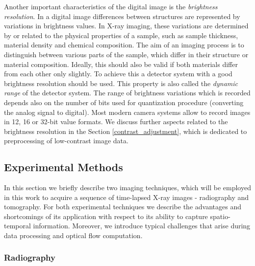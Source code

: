 


Another important characteristics of the digital image is the \textit{brightness resolution}. In a digital image differences between structures are represented by variations in brightness values. In X-ray imaging, these variations are determined by or related to the physical properties of a sample, such as sample thickness, material density and chemical composition. The aim of an imaging process is to distinguish between various parts of the sample, which differ in their structure or material composition. Ideally, this should also be valid if both materials differ from each other only slightly. To achieve this a detector system with a good brightness resolution should be used. This property is also called the \textit{dynamic range} of the detector system. The range of brightness variations which is recorded depends also on the number of bits used for quantization procedure (converting the analog signal to digital).  Most modern camera systems allow to record images in 12, 16 or 32-bit value formats. We discuss further aspects related to the brightness resolution in the Section \ref{contrast_adjustment}, which is dedicated to preprocessing of low-contrast image data.

\subsection{Experimental Methods}

In this section we briefly describe two imaging techniques, which will be employed in this work to acquire a sequence of time-lapsed X-ray images - radiography and tomography. For both experimental techniques we describe the advantages and shortcomings of its application with respect to its ability to capture spatio-temporal information. Moreover, we introduce typical challenges that arise during data processing and optical flow computation.

\subsubsection{Radiography}

